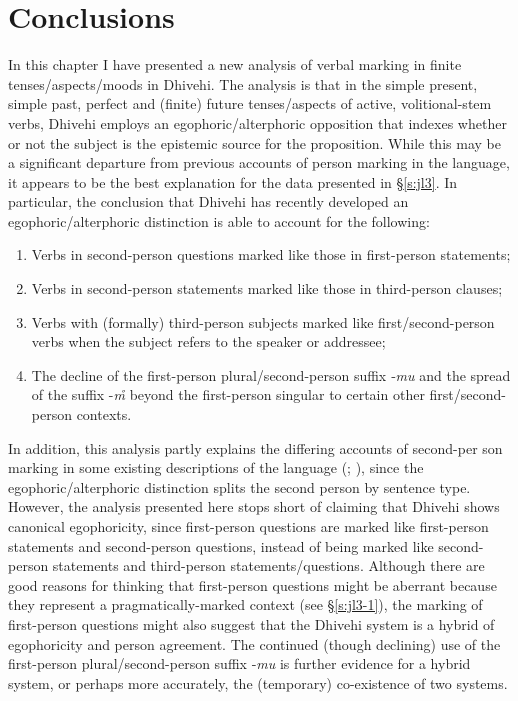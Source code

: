 \documentclass[output=paper]{langsci/langscibook}
\begin{document}
\section{Conclusions}\label{s:jl5}

In this chapter I have presented a new analysis of verbal marking in finite tenses/aspects/moods in Dhivehi. The analysis is that in the simple present, simple past, perfect and (finite) future tenses/aspects of active, volitional-stem verbs, Dhivehi employs an egophoric/alterphoric opposition that indexes whether or not the subject is the epistemic source for the proposition. While this may be a significant departure from previous accounts of person marking in the language, it appears to be the best explanation for the data presented in §\ref{s:jl3}. In particular, the conclusion that Dhivehi has recently developed an egophoric/alterphoric distinction is able to account for the following:

\begin{enumerate}[label=\roman*.]\sloppy
	\item Verbs in second-person questions marked like those in first-person statements; 
	\item Verbs in second-person statements marked like those in third-person clauses;
	\item Verbs with (formally) third-person subjects marked like first/second-person verbs when the subject refers to the speaker or addressee;
	\item The decline of the first-person plural/second-person suffix ‑\textit{mu} and the spread of the suffix -\textit{m̊} beyond the first-person singular to certain other first/second-person contexts.
\end{enumerate}
\fussy

In addition, this analysis partly explains the differing accounts of second-per\-   son marking in some existing descriptions of the language (\citealt{CainGair2000}; \citealt{Fritz2002}), since the egophoric/alterphoric distinction splits the second person by sentence type. However, the analysis presented here stops short of claiming that Dhivehi shows canonical egophoricity, since first-person questions are marked like first-person statements and second-person questions, instead of being marked like second-person statements and third-person statements/questions. Although there are good reasons for thinking that first-person questions might be aberrant because they represent a pragmatically-marked context (see §‎\ref{s:jl3-1}), the marking of first-person questions might also suggest that the Dhivehi system is a hybrid of egophoricity and person agreement. The continued (though declining) use of the first-person plural/second-person suffix ‑\textit{mu} is further evidence for a hybrid system, or perhaps more accurately, the (temporary) co-existence of two systems.
\end{document}
